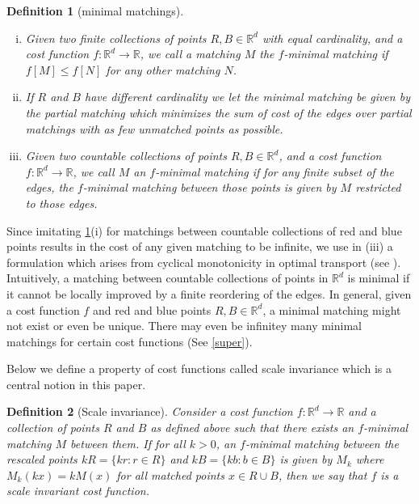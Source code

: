 \documentclass{article}
\newtheorem{definition}{Definition}
\newcommand{\R}{\mathbb{R}}
\begin{document}
\begin{definition}[minimal matchings] \label{def:mm}

  \begin{enumerate}[(i)]
    \item  Given two finite collections of
points $R, B\in\R^d$ with equal cardinality, and a cost function
$f:\R^d\rightarrow\R$, we call a matching $M$ the $f$-minimal matching if
$f[M]\leq f[N]$ for any other matching $N$.

\item If  $R$ and $B$ have different cardinality we let the minimal matching
be given by the partial matching which minimizes the sum of cost of
the edges over partial matchings with as few unmatched points as
possible.

\item Given two countable collections of points $R,B\in\R^d$, and a
  cost function $f:\R^d\rightarrow \R$, we call $M$ an $f$-minimal
  matching if for any finite subset of the edges, the $f$-minimal
  matching between those points is given by $M$ restricted to those
  edges.
  \end{enumerate}
\end{definition}

Since imitating  \cref{def:mm}(i) for matchings
between countable collections of red and blue points results in the
cost of any given matching to be infinite, we use in (iii) a formulation which
arises from cyclical monotonicity in optimal transport  (see
\cite{villani2008optimal}). Intuitively, a matching between countable
collections of points in $\R^d$ is minimal if it cannot be locally
improved by a finite reordering of the edges.
In general, given a cost function $f$ and red and blue points $R,B
\in\R^d$, a minimal matching might not exist or even be unique. There may
even be infinitey many minimal matchings for certain cost functions
(See \cref{super}).

Below we define a property of cost functions called scale invariance which is a central notion in this paper.

\begin{definition}[Scale invariance]
Consider a cost function $f:\R^d\rightarrow\R$ and a collection of
points $R$ and $B$ as defined above such that there exists an $f$-minimal matching $M$ between
them. If for all $k>0$, an $f$-minimal matching between the rescaled
points $kR=\{kr:r\in R\}$ and $kB=\{kb:b\in B\}$ is given by $M_k$
where $M_k(kx)=kM(x)$ for all matched points $x\in R\cup B$, then we say that $f$ is
a scale invariant cost function.
\end{definition}
\end{document}

